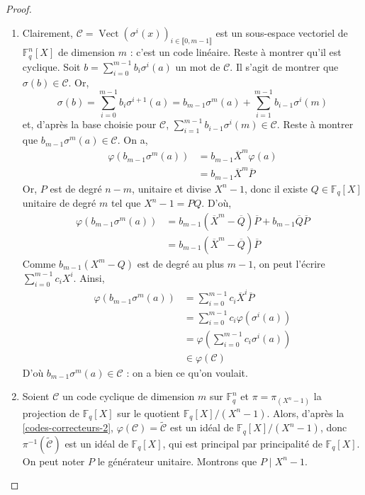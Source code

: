 	\begin{proof}
		\begin{enumerate}[label=(\roman*)]
			\item Clairement, $\mathcal{C} = \operatorname{Vect}(\sigma^{i}(x))_{i \in \llbracket 0, m-1 \rrbracket}$ est un sous-espace vectoriel de $\mathbb{F}_q^n[X]$ de dimension $m$ : c'est un code linéaire. Reste à montrer qu'il est cyclique. Soit $b = \sum_{i=0}^{m-1} b_i \sigma^i(a)$ un mot de $\mathcal{C}$. Il s'agit de montrer que $\sigma(b) \in \mathcal{C}$. Or,
			\[ \sigma(b) = \sum_{i=0}^{m-1} b_i \sigma^{i+1}(a) = b_{m-1} \sigma^m(a) + \sum_{i=1}^{m-1} b_{i-1} \sigma^i(m) \]
			et, d'après la base choisie pour $\mathcal{C}$, $\sum_{i=1}^{m-1} b_{i-1} \sigma^i(m) \in \mathcal{C}$. Reste à montrer que $b_{m-1} \sigma^m(a) \in \mathcal{C}$. On a,
			\begin{align*}
				\varphi(b_{m-1} \sigma^m(a)) &= b_{m-1} \overline{X}^m \varphi(a) \\
				&= b_{m-1} \overline{X}^m \overline{P}
			\end{align*}
			Or, $P$ est de degré $n-m$, unitaire et divise $X^n - 1$, donc il existe $Q \in \mathbb{F}_q[X]$ unitaire de degré $m$ tel que $X^n - 1 = PQ$. D'où,
			\begin{align*}
				\varphi(b_{m-1} \sigma^m(a)) &= b_{m-1} (\overline{X}^m - \overline{Q})\overline{P} + b_{m-1}\overline{Q}\overline{P} \\
				&= b_{m-1} (\overline{X}^m - \overline{Q}) \overline{P}
			\end{align*}
			Comme $b_{m-1} (X^m - Q)$ est de degré au plus $m-1$, on peut l'écrire $\sum_{i=0}^{m-1} c_i X^i$. Ainsi,
			\begin{align*}
				\varphi(b_{m-1} \sigma^m(a)) &= \sum_{i=0}^{m-1} c_i \overline{X}^i \overline{P} \\
				&= \sum_{i=0}^{m-1} c_i \varphi(\sigma^i(a)) \\
				&= \varphi \left( \sum_{i=0}^{m-1} c_i \sigma^i(a) \right) \\
				&\in \varphi(\mathcal{C})
			\end{align*}
			D'où $b_{m-1} \sigma^m(a) \in \mathcal{C}$ : on a bien ce qu'on voulait.
			\item Soient $\mathcal{C}$ un code cyclique de dimension $m$ sur $\mathbb{F}_q^n$ et $\pi = \pi_{(X^n-1)}$ la projection de $\mathbb{F}_q[X]$ sur le quotient $\mathbb{F}_q[X]/(X^n-1)$. Alors, d'après la \cref{codes-correcteurs-2}, $\varphi(\mathcal{C}) = \widetilde{\mathcal{C}}$ est un idéal de $\mathbb{F}_q[X]/(X^n-1)$, donc $\pi^{-1}(\widetilde{\mathcal{C}})$ est un idéal de $\mathbb{F}_q[X]$, qui est principal par principalité de $\mathbb{F}_q[X]$. On peut noter $P$ le générateur unitaire. Montrons que $P \mid X^n - 1$.

\end{enumerate}
\end{proof}
